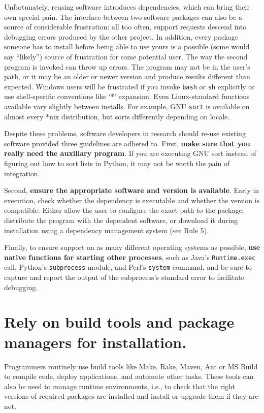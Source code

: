 \documentclass[10pt,letterpaper]{article}
\begin{document}
Unfortunately, reusing software introduces dependencies, which can
bring their own special pain.  The interface between two software
packages can also be a source of considerable frustration: all too
often, support requests descend into debugging errors produced by the
other project. 
In addition, every package someone has to install
before being able to use yours is a
possible (some would say ``likely'') source of frustration for some
potential user. The way the second program is invoked can throw up errors.
The program may not be in the user's path, or it may be an
older or newer version and produce results different than expected.
Windows users will be frustrated if you invoke \texttt{bash} or \texttt{sh} explicitly or
use shell-specific conventions like `*' expansion.
Even Linux-standard functions available vary slightly between
installs. For example, GNU \texttt{sort} is available on almost every
*nix distribution, but sorts differently depending on locale.

Despite these problems, software developers in research should
re-use existing software provided three guidelines are adhered to.
First, 
\textbf{make sure that you really need the auxiliary program}. If you are
executing GNU sort instead of figuring out how to sort lists in Python,
it may not be worth the pain of integration.

Second, \textbf{ensure the appropriate software and version is available}.
Early in execution, check whether the dependency is executable and whether the
version is compatible.
Either allow the user to
configure the exact path to the package, distribute the program with the
dependent software, or download it during installation using a
dependency management system (see Rule 5). 

Finally, to ensure support on as many different operating systems as
possible, \textbf{use native functions for starting other processes}, such as
Java's \texttt{Runtime.exec} call, Python's \texttt{subprocess} module, and Perl's \texttt{system}
command, and be sure to capture and report the output of the subprocess's standard error
to facilitate debugging.

\section{Rely on build tools and package managers for installation.}

Programmers routinely use build tools like Make, Rake, Maven, Ant or MS Build
to compile code, deploy applications, and automate other tasks.
These tools can also be used to manage runtime environments,
i.e.,
to check that the right versions of required packages are installed
and install or upgrade them if they are not.
\end{document}
